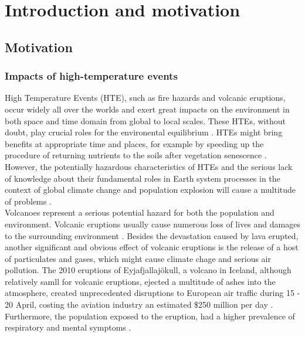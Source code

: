 \chapter{Introduction and motivation}

\label{Chapter1}

\newcommand{\keyword}[1]{\textbf{#1}}
\newcommand{\tabhead}[1]{\textbf{#1}}
\newcommand{\code}[1]{\texttt{#1}}
\newcommand{\file}[1]{\texttt{\bfseries#1}}
\newcommand{\option}[1]{\texttt{\itshape#1}}


\section{Motivation}


\subsection{Impacts of high-temperature events}

High Temperature Events (HTE), such as fire hazards and volcanic eruptions, occur widely all over the worlds and exert great impacts on the environment in both space and time domain from global to local scales. These HTEs, without doubt, play crucial roles for the environental equilibrium \parencite{Reference1}. HTEs might bring benefits at appropriate time and places, for example by speeding up the procedure of returning nutrients to the soils after vegetation senescence \parencite{Reference2}. However, the potentially hazardous characteristics of HTEs and the serious lack of knowledge about their fundamental roles in Earth system processes in the context of global climate change and population explosion will cause a multitude of problems \parencite{Reference3}.\\

\noindent Volcanoes represent a serious potential hazard for both the population and environment. Volcanic eruptions usually cause numerous loss of lives and damages to the surrounding environment \parencite{Reference12}. Besides the devastation caused by lava erupted, another significant and obvious effect of volcanic eruptions is the release of a host of particulates and gases, which might cause climate chage and serious air pollution. The 2010 eruptions of Eyjafjallajökull, a volcano in Iceland, although relatively samll for volcanic eruptions, ejected a multitude of ashes into the atmosphere, created unprecedented disruptions to European air traffic during 15 - 20 April, costing the aviation industry an estimated \$250 million per day \parencite{Reference4}. Furthermore, the population exposed to the eruption, had a higher prevalence of respiratory and mental symptoms \parencite{Reference5}.\\

